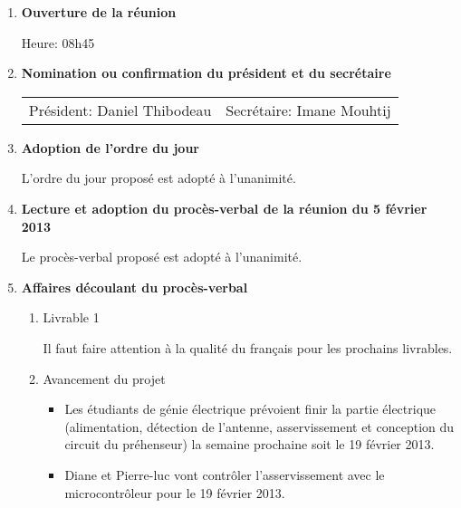 \documentclass[12pt]{ULojpv}
\begin{document}
\entete
\begin{enumerate}
\item \textbf{Ouverture de la réunion}

Heure: 08h45


\item \textbf{Nomination ou confirmation du président et du secrétaire}

\begin{tabular}{@{}ll}
   Président: Daniel Thibodeau
   & Secrétaire: Imane Mouhtij
\end{tabular}


\item \textbf{Adoption de l'ordre du jour}

L'ordre du jour proposé est adopté à l'unanimité.


\item \textbf{Lecture et adoption du procès-verbal de la réunion du 5 février 2013}

Le procès-verbal proposé est adopté à l'unanimité.


\item \textbf{Affaires découlant du procès-verbal}

\begin{enumerate}

\item Livrable 1 

Il faut faire attention à la qualité du français pour les prochains livrables.


\item Avancement du projet

\begin{itemize}

\item Les étudiants de génie électrique prévoient finir la partie électrique (alimentation, détection de l'antenne, asservissement et conception du circuit du préhenseur) la semaine prochaine soit le 19 février 2013.

\item Diane et Pierre-luc vont contrôler l'asservissement avec le microcontrôleur pour le 19 février 2013.


\end{itemize}
\end{enumerate}
\end{enumerate}
\end{document}
